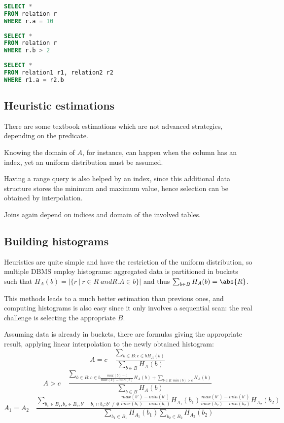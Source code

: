 \begin{lstlisting}[language=SQL]
SELECT *
FROM relation r
WHERE r.a = 10
	
SELECT *
FROM relation r
WHERE r.b > 2
	
SELECT *
FROM relation1 r1, relation2 r2
WHERE r1.a = r2.b
\end{lstlisting}

\subsection{Heuristic estimations}
There are some textbook estimations which are not advanced strategies, depending on the predicate.

Knowing the domain of $A$, for instance, can happen when the column has an index, yet an uniform distribution must be assumed.

Having a range query is also helped by an index, since this additional data structure stores the minimum and maximum value, hence selection can be obtained by interpolation. 

Joins again depend on indices and domain of the involved tables.

\subsection{Building histograms}
Heuristics are quite simple and have the restriction of the uniform distribution, so multiple DBMS employ histograms: aggregated data is partitioned in buckets such that $H_A(b) = |\{r\ |\ r \in R \;and R.A \in b\}|$ and thus $\sum_{b \in B} H_A(b) = \abs{R}$.

This methods leads to a much better estimation than previous ones, and computing histograms is also easy since it only involves a sequential scan: the real challenge is selecting the appropriate $B$.

Assuming data is already in buckets, there are formulas giving the appropriate result, applying linear interpolation to the newly obtained histogram:
$$A = c \quad \frac{\sum_{b \in B:c \in b H_A(b)}}{\sum_{b \in B}H_A(b)}$$
$$A > c \quad \frac{\sum_{b \in B:c \in b \frac{max(b) - c}{max(b) - min(b)} H_A(b) + \sum_{b \in B:min(b) > c} H_A(b)}}{\sum_{b \in B}H_A(b)}$$
$$A_1 = A_2 \quad \frac{\sum_{b_1 \in B_1, b_2 \in B_2, b' = b_1 \cap b_2: b' \neq \emptyset} \frac{max(b') - min(b')}{max(b_1) - min(b_1)} H_{A_1}(b_1) \frac{max(b') - min(b')}{max(b_2) - min(b_2)} H_{A_2}(b_2)}{\sum_{b_1 \in B_1}H_{A_1}(b_1) \sum_{b_2 \in B_2}H_{A_2}(b_2)}$$

